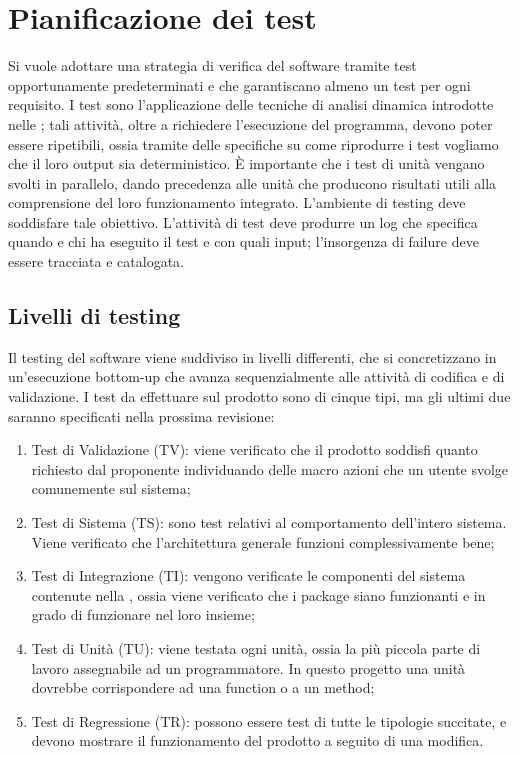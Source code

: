 \newpage
\section{Pianificazione dei test}

	Si vuole adottare una strategia di verifica del software tramite test opportunamente predeterminati e che garantiscano almeno un test per ogni requisito. I test sono l’applicazione delle tecniche di analisi dinamica introdotte nelle \NormeDiProgetto; tali attività, oltre a richiedere l’esecuzione del programma, devono poter essere ripetibili, ossia tramite delle specifiche su come riprodurre i test vogliamo che il loro output sia deterministico. È importante che i test di unità vengano svolti in parallelo, dando precedenza alle unità che producono risultati utili alla comprensione del loro funzionamento integrato. L’ambiente di testing deve soddisfare tale obiettivo. L’attività di test deve produrre un log che specifica quando e chi ha eseguito il test e con quali input; l’insorgenza di failure deve essere tracciata e catalogata.

\subsection{Livelli di testing}
	Il testing del software viene suddiviso in livelli differenti, che si concretizzano in un'esecuzione bottom-up che avanza sequenzialmente alle attività di codifica e di validazione. I test da effettuare sul prodotto sono di cinque tipi, ma gli ultimi due saranno specificati nella prossima revisione:

\begin{enumerate}
	\item Test di Validazione (TV): viene verificato che il prodotto soddisfi quanto richiesto dal proponente individuando delle macro azioni che un utente svolge comunemente sul sistema;
	\item Test di Sistema (TS): sono test relativi al comportamento dell’intero sistema. Viene verificato che l'architettura generale funzioni complessivamente bene;
	\item Test di Integrazione (TI): vengono verificate le componenti del sistema contenute nella \SpecificaTecnica, ossia viene verificato che i package siano funzionanti e in grado di funzionare nel loro insieme;
	\item Test di Unità (TU): viene testata ogni unità, ossia la più piccola parte di lavoro assegnabile ad un programmatore. In questo progetto una unità dovrebbe corrispondere ad una function o a un method;
	\item Test di Regressione (TR): possono essere test di tutte le tipologie succitate, e devono mostrare il funzionamento del prodotto a seguito di una modifica.
\end{enumerate}


